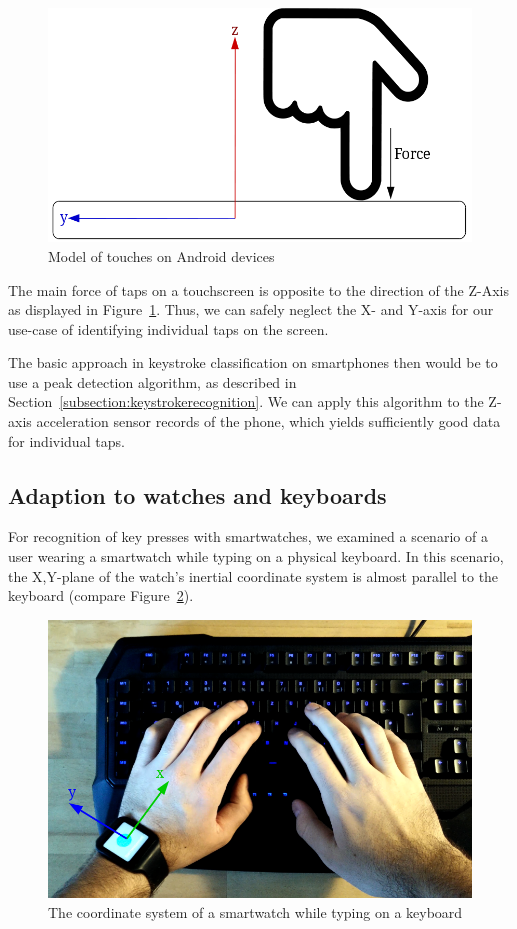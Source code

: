 \begin{figure}
    \centering
    \includegraphics[width=\textwidth]{figures/TapDirection.png}
    \caption{Model of touches on Android devices}
    \label{fig:touchdirection}
\end{figure}
The main force of taps on a touchscreen is opposite to the direction of the Z-Axis as displayed in Figure~\ref{fig:touchdirection}. Thus, we can safely neglect the X- and Y-axis for our use-case of identifying individual taps on the screen.

The basic approach in keystroke classification on smartphones then would be to use a peak detection algorithm, as described in Section~\ref{subsection:keystrokerecognition}. We can apply this algorithm to the Z-axis acceleration sensor records of the phone, which yields sufficiently good data for individual taps.

\subsection{Adaption to watches and keyboards}
For recognition of key presses with smartwatches, we examined a scenario of a user wearing a smartwatch while typing on a physical keyboard. In this scenario, the X,Y-plane of the watch's inertial coordinate system is almost parallel to the keyboard (compare Figure~\ref{fig:watchcoordinate}).

\begin{figure}
    \centering
    \includegraphics[width=\textwidth]{figures/WatchCoordinateSystem.png}
    \caption{The coordinate system of a smartwatch while typing on a keyboard}
    \label{fig:watchcoordinate}
\end{figure}

